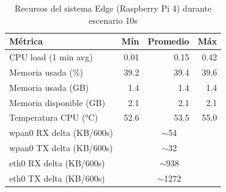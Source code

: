 
\begin{table}[htbp]
\centering
\caption{Recursos del sistema Edge (Raspberry Pi 4) durante escenario 10s}
\label{tab:edge-resources-10s}
\begin{tabular}{lrrr}
\toprule
\textbf{Métrica} & \textbf{Mín} & \textbf{Promedio} & \textbf{Máx} \\
\midrule
CPU load (1 min avg) & 0.01 & 0.15 & 0.42 \\
Memoria usada (\%) & 39.2 & 39.4 & 39.6 \\
Memoria usada (GB) & 1.4 & 1.4 & 1.4 \\
Memoria disponible (GB) & 2.1 & 2.1 & 2.1 \\
Temperatura CPU (°C) & 52.6 & 53.5 & 55.0 \\
wpan0 RX delta (KB/600s) & \multicolumn{3}{c}{$\sim$54} \\
wpan0 TX delta (KB/600s) & \multicolumn{3}{c}{$\sim$32} \\
eth0 RX delta (KB/600s) & \multicolumn{3}{c}{$\sim$938} \\
eth0 TX delta (KB/600s) & \multicolumn{3}{c}{$\sim$1272} \\
\bottomrule
\end{tabular}
\end{table}
